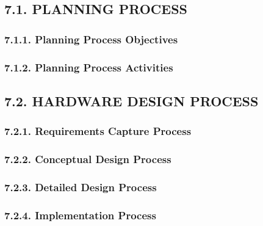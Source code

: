 \documentclass[
]{article}
\begin{document}
\hypertarget{planning-process-1}{%
\subsection{7.1. PLANNING PROCESS}\label{planning-process-1}}

\hypertarget{planning-process-objectives-1}{%
\subsubsection{7.1.1. Planning Process
Objectives}\label{planning-process-objectives-1}}

\hypertarget{planning-process-activities-1}{%
\subsubsection{7.1.2. Planning Process
Activities}\label{planning-process-activities-1}}

\hypertarget{hardware-design-process-1}{%
\subsection{7.2. HARDWARE DESIGN
PROCESS}\label{hardware-design-process-1}}

\hypertarget{requirements-capture-process-1}{%
\subsubsection{7.2.1. Requirements Capture
Process}\label{requirements-capture-process-1}}

\hypertarget{conceptual-design-process-1}{%
\subsubsection{7.2.2. Conceptual Design
Process}\label{conceptual-design-process-1}}

\hypertarget{detailed-design-process-1}{%
\subsubsection{7.2.3. Detailed Design
Process}\label{detailed-design-process-1}}

\hypertarget{implementation-process-1}{%
\subsubsection{7.2.4. Implementation
Process}\label{implementation-process-1}}
\end{document}
